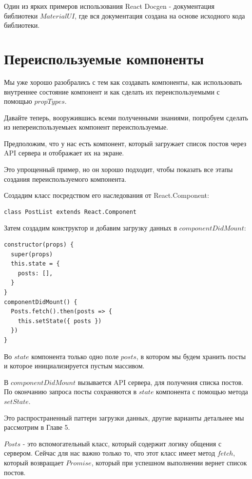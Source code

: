 Один из ярких примеров использования React Docgen - документация библиотеки $Material UI$, где вся документация создана на основе исходного кода библиотеки.


\section{Переиспользуемые компоненты}

Мы уже хорошо разобрались с тем как создавать компоненты, как использовать внутреннее состояние компонент и как сделать их переиспользуемыми с помощью $propTypes$.

Давайте теперь, вооружившись всеми полученными знаниями, попробуем сделать из непереиспользуемыех компонент переиспользуемые.

Предположим, что у нас есть компонент, который загружает список постов через API сервера и отображает их на экране.

Это упрощенный пример, но он хорошо подходит, чтобы показать все этапы создания переиспользуемого компонента.

Создадим класс посредством его наследования от React.Component:

\begin{lstlisting}
class PostList extends React.Component
\end{lstlisting}

Затем создадим конструктор и добавим загрузку данных в $componentDidMount$:

\begin{lstlisting}
constructor(props) {
  super(props)
  this.state = {
    posts: [],
  } 
}
componentDidMount() {
  Posts.fetch().then(posts => {
    this.setState({ posts })
  })
}
\end{lstlisting}

Во $state$ компонента только одно поле $posts$, в котором мы будем хранить посты и которое инициализируется пустым массивом.

В $componentDidMount$ вызывается API сервера, для получения списка постов. По окончанию запроса посты сохраняются в $state$ компонента с помощью метода $setState$.

Это распространенный паттерн загрузки данных, другие варианты детальнее мы рассмотрим в Главе 5.

$Posts$ - это вспомогательный класс, который содержит логику общения с сервером. Сейчас для нас важно только то, что этот класс имеет метод $fetch$, который возвращает $Promise$, который при успешном выполнении вернет список постов.

